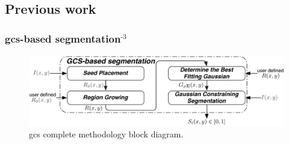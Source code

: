 \subsection{Previous work}

\begin{frame}\frametitle{\acf{gcs}-based segmentation\footnotemark[1]$^{\text{-3}}$}
\begin{center}

\begin{figure}[Htb]%
\centering
\includegraphics[trim=2 0 2 2, clip,width=\textwidth]{IWDMmethodDiagram}
\caption{\centering \ac{gcs} complete methodology block diagram.}
\label{fig:methodDiagram}
\end{figure}
\end{center}
\end{frame}

